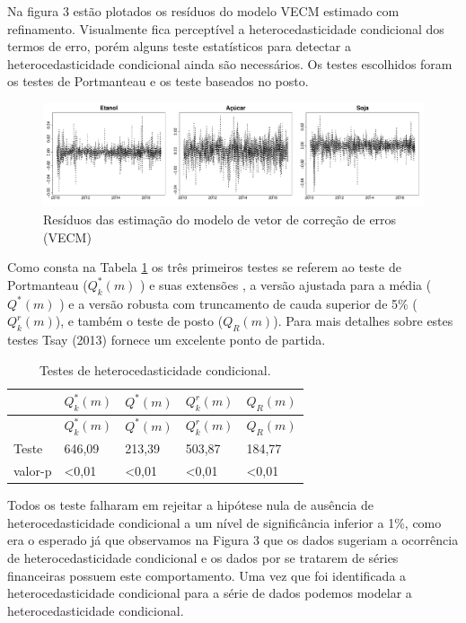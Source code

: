 Na figura 3 estão plotados os resíduos do modelo VECM estimado com
refinamento. Visualmente fica perceptível a heterocedasticidade
condicional dos termos de erro, porém alguns teste estatísticos para
detectar a heterocedasticidade condicional ainda são necessários. Os
testes escolhidos foram os testes de Portmanteau e os teste baseados no
posto. 

\begin{figure}[htbp]
	\centering
	\includegraphics{VECM resid-1.pdf}
	\caption{Resíduos das estimação do modelo de vetor de correção de erros
		(VECM)}
\end{figure}

Como consta na Tabela \ref{marcht} os três primeiros testes se referem ao
teste de Portmanteau (\(Q^*_k(m)\) ) e suas extensões , a versão
ajustada para a média (\(Q^*(m)\) ) e a versão robusta com truncamento
de cauda superior de 5\% (\(Q^r_k(m)\)), e também o teste de posto
(\(Q_R(m)\)). Para mais detalhes sobre estes testes Tsay (2013) fornece
um excelente ponto de partida.



\begin{longtable}[]{@{}lllll@{}}
\caption{\label{marcht}Testes de heterocedasticidade condicional.}\tabularnewline
\toprule
& \(Q^*_k(m)\) & \(Q^*(m)\) & \(Q^r_k(m)\) & \(Q_R(m)\)\tabularnewline
\midrule
\endfirsthead
\toprule
& \(Q^*_k(m)\) & \(Q^*(m)\) & \(Q^r_k(m)\) & \(Q_R(m)\)\tabularnewline
\midrule
\endhead
Teste & 646,09 & 213,39 & 503,87 & 184,77\tabularnewline
valor-p & \textless{}0,01 & \textless{}0,01 & \textless{}0,01 &
\textless{}0,01\tabularnewline
\bottomrule
\end{longtable}

Todos os teste falharam em rejeitar a hipótese nula de ausência de
heterocedasticidade condicional a um nível de significância inferior a
1\%, como era o esperado já que observamos na Figura 3 que os dados
sugeriam a ocorrência de heterocedasticidade condicional e os dados por
se tratarem de séries financeiras possuem este comportamento. Uma vez
que foi identificada a heterocedasticidade condicional para a série de
dados podemos modelar a heterocedasticidade condicional.

